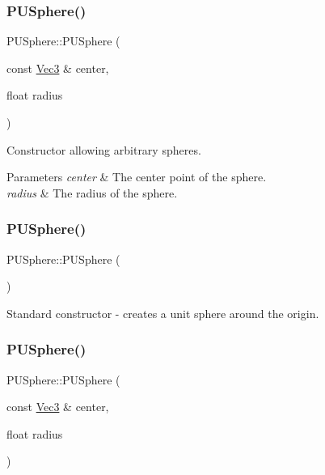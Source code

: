 \subsubsection{\texorpdfstring{P\+U\+Sphere()}{PUSphere()}\hspace{0.1cm}{\footnotesize\ttfamily [2/4]}}
{\footnotesize\ttfamily P\+U\+Sphere\+::\+P\+U\+Sphere (\begin{DoxyParamCaption}\item[{const \hyperlink{classVec3}{Vec3} \&}]{center,  }\item[{float}]{radius }\end{DoxyParamCaption})}

Constructor allowing arbitrary spheres. 
\begin{DoxyParams}{Parameters}
{\em center} & The center point of the sphere. \\
\hline
{\em radius} & The radius of the sphere. \\
\hline
\end{DoxyParams}
\mbox{\label{classPUSphere_a578240112ac2f4a13eb19f2c27f29722}} 
\subsubsection{\texorpdfstring{P\+U\+Sphere()}{PUSphere()}\hspace{0.1cm}{\footnotesize\ttfamily [3/4]}}
{\footnotesize\ttfamily P\+U\+Sphere\+::\+P\+U\+Sphere (\begin{DoxyParamCaption}{ }\end{DoxyParamCaption})}

Standard constructor -\/ creates a unit sphere around the origin. \mbox{\label{classPUSphere_a91c8a4763bfba145f5a93309f92ed9de}} 
\subsubsection{\texorpdfstring{P\+U\+Sphere()}{PUSphere()}\hspace{0.1cm}{\footnotesize\ttfamily [4/4]}}
{\footnotesize\ttfamily P\+U\+Sphere\+::\+P\+U\+Sphere (\begin{DoxyParamCaption}\item[{const \hyperlink{classVec3}{Vec3} \&}]{center,  }\item[{float}]{radius }\end{DoxyParamCaption})}

